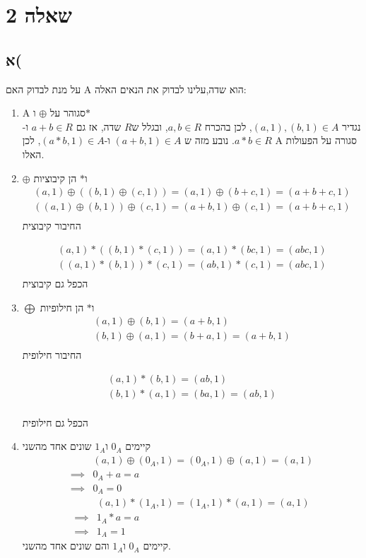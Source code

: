 \documentclass{article}
\begin{document}
\section{שאלה 2}

\subsection{א(}
  
  
על מנת לבדוק האם A הוא שדה,עלינו לבדוק את הנאים האלה:
\begin{enumerate}
  \item A סגוהר על $\oplus$ ו$*$\\
    נגדיר $(a,1), (b,1) \in A$, לכן בהכרח $a, b \in R$, ובגלל ש$R$ שדה, אז גם $a+b \in R$ ו-$a*b \in R$. נובע מזה ש $(a+b,1) \in A$ ו-$(a*b, 1) \in A$, לכן A סגורה על הפעולות האלו.

  \item $\oplus$ ו$*$ הן קיבוציות
    \begin{align*}
      (a,1) \oplus ((b,1) \oplus (c,1)) = (a,1) \oplus (b+c, 1) = (a+b+c, 1)\\
      ((a,1) \oplus (b,1)) \oplus (c,1) = (a+b,1) \oplus (c, 1) = (a+b+c, 1)\\
    \end{align*}
    החיבור קיבוצית

    \begin{align*}
      (a,1) * ((b,1) * (c,1)) = (a,1) * (bc, 1) = (abc, 1)\\
      ((a,1) * (b,1)) * (c,1) = (ab,1) * (c, 1) = (abc, 1)\\
    \end{align*}
    הכפל גם קיבוצית

  \item $\bigoplus$ ו$*$ הן חילופיות
    \begin{align*}
      (a,1) \oplus (b,1) = (a+b, 1)\\
      (b,1) \oplus (a,1) = (b+a, 1) = (a+b, 1)\\
    \end{align*}
    החיבור חילופית

    \begin{align*}
      (a,1) * (b,1) = (ab, 1)\\
      (b,1) * (a,1) = (ba, 1) = (ab, 1)\\
    \end{align*}

    הכפל גם חילופית


  \item קיימים $0_A$ ו$1_A$ שונים אחד מהשני
    \begin{align*}
      &(a,1) \oplus (0_A, 1) = (0_A, 1) \oplus (a, 1) = (a, 1)\\
      \implies &0_A+a = a\\
      \implies &0_A = 0
    \end{align*}    
    \begin{align*}
      &(a,1) * (1_A, 1) = (1_A, 1) * (a, 1) = (a, 1)\\
      \implies &1_A*a = a\\
      \implies &1_A = 1
    \end{align*}    
    קיימים $0_A$ ו$1_A$ והם שונים אחד מהשני.



\end{enumerate}
\end{document}
